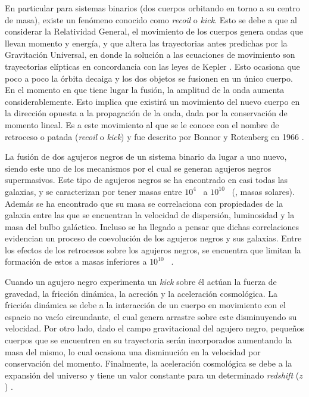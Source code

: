 	En particular para sistemas binarios (dos cuerpos orbitando en torno a su centro de masa), existe un fen\'omeno conocido como \textit{recoil} o \textit{kick}. Esto se debe a que al considerar la Relatividad General, el movimiento de los cuerpos genera ondas que llevan momento y energ\'ia, y que altera las trayectorias antes predichas por la Gravitación Universal, en donde la solución a las ecuaciones de movimiento son trayectorias elípticas en concordancia con las leyes de Kepler \cite{hughes2005black, hoyng2006gravitational, brugmann2018fundamentals}. Esto ocasiona que poco a poco la \'orbita decaiga y los dos objetos se fusionen en un \'unico cuerpo. En el momento en que tiene lugar la fusi\'on, la amplitud de la onda aumenta considerablemente. Esto implica que existir\'a un movimiento del nuevo cuerpo en la direcci\'on opuesta a la propagaci\'on de la onda, dada por la conservaci\'on de momento lineal. Es a este movimiento al que se le conoce con el nombre de retroceso o patada (\textit{recoil} o \textit{kick}) \cite{hughes2005black} y fue descrito por Bonnor y Rotenberg en 1966 \cite{bonnor1966gravitational}. 
	
	La fusi\'on de dos agujeros negros de un sistema binario da lugar a uno nuevo, siendo este uno de los mecanismos por el cual se generan agujeros negros supermasivos. Este tipo de agujeros negros se ha encontrado en casi todas las galaxias, y se caracterizan por tener masas entre $10^4$ \sm\ a $10^{10}$ \sm\ (\sm, masas solares). Adem\'as se ha encontrado que su masa se correlaciona con propiedades de la galaxia entre las que se encuentran la velocidad de dispersi\'on, luminosidad y la masa del bulbo gal\'actico. Incluso se ha llegado a pensar que dichas correlaciones evidencian un proceso de coevoluci\'on de los agujeros negros y sus galaxias. Entre los efectos de los retrocesos sobre los agujeros negros, se encuentra que limitan la formaci\'on de estos a masas inferiores a $10^{10}$ \sm\ \cite{choksi2017recoiling}.
	
	Cuando un agujero negro experimenta un \textit{kick} sobre \'el actúan la fuerza de gravedad, la fricci\'on din\'amica, la acreci\'on y la aceleraci\'on cosmol\'ogica. La fricci\'on din\'amica se debe a la interacci\'on de un cuerpo en movimiento con el espacio no vac\'io circundante, el cual genera arrastre sobre este disminuyendo su velocidad. Por otro lado, dado el campo gravitacional del agujero negro, pequeños cuerpos que se encuentren en su trayectoria ser\'an incorporados aumentando la masa del mismo, lo cual ocasiona una disminuci\'on en la velocidad por conservaci\'on del momento. Finalmente, la aceleraci\'on cosmol\'ogica se debe a la expansi\'on del universo y tiene un valor constante para un determinado \textit{redshift} ($z$) \cite{choksi2017recoiling}.
	
